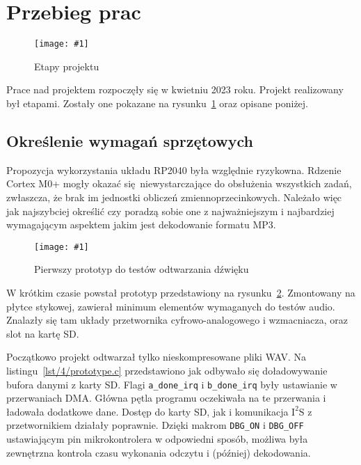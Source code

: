 \documentclass[polish]{aghengthesis}
\newcommand{\imgint}[4]{
	\begin{figure}[{#4}]
		\centering
		\texttt{[image: \#1]}
		\caption{#2}
		\label{#1}
	\end{figure}
}
\newcommand{\imgh}[3]{\imgint{#1}{#2}{#3}{H}}
\newcommand{\isqs}{$\text{I}^{2}\text{S}$}
\newcommand{\lstfile}[3]{
	\noindent
	\hspace{0.1\linewidth}
	\begin{minipage}{0.8\linewidth}
		
	\end{minipage}
	\vspace{0.3cm}
}
\begin{document}
	\section{Przebieg prac}
		\imgh{4/PicoRadio-steps}{Etapy projektu}{1}
	
		Prace nad projektem rozpoczęły się w kwietniu 2023 roku. Projekt realizowany był etapami. Zostały one pokazane na rysunku~\ref{4/PicoRadio-steps} oraz opisane poniżej.
		
		\subsection{Określenie wymagań sprzętowych}
			Propozycja wykorzystania układu RP2040 była względnie ryzykowna. Rdzenie Cortex M0+ mogły okazać się niewystarczające do obsłużenia wszystkich zadań, zwłaszcza, że brak im jednostki obliczeń zmiennoprzecinkowych. Należało więc jak najszybciej określić czy poradzą sobie one z najważniejszym i najbardziej wymagającym aspektem jakim jest dekodowanie formatu MP3.
			
			\imgh{4/prototype_1}{Pierwszy prototyp do testów odtwarzania dźwięku}{0.6}
			
			W krótkim czasie powstał prototyp przedstawiony na rysunku~\ref{4/prototype_1}. Zmontowany na płytce stykowej, zawierał minimum elementów wymaganych do testów audio. Znalazły się tam układy przetwornika cyfrowo-analogowego i wzmacniacza, oraz slot na kartę SD.
			
			\lstfile{c}{Realizacja podstawowego ładowania bufora}{lst/4/prototype.c}
			
			Początkowo projekt odtwarzał tylko nieskompresowane pliki WAV. Na listingu~\ref{lst/4/prototype.c} przedstawiono jak odbywało się doładowywanie bufora danymi z karty SD. Flagi \lstinline|a_done_irq| i \lstinline|b_done_irq| były ustawianie w przerwaniach DMA. Główna pętla programu oczekiwała na te przerwania i ładowała dodatkowe dane. Dostęp do karty SD, jak i komunikacja \isqs{} z przetwornikiem działały poprawnie. Dzięki makrom \lstinline|DBG_ON| i \lstinline|DBG_OFF| ustawiającym pin mikrokontrolera w odpowiedni sposób, możliwa była zewnętrzna kontrola czasu wykonania odczytu i (później) dekodowania.
			
			\lstfile{c}{Pomiar czasu dekodowania ramki MP3}{lst/4/benchmark.c}
			
\end{document}
